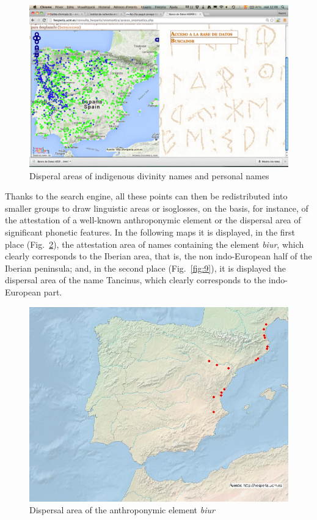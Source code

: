 \documentclass[amsthm,ebook]{saparticle}
\begin{document}
\begin{figure}[!hbp]
\centering
 \includegraphics[width=\columnwidth]{EpigraphyandonomasticsinHesperiadatabanktemplate-img007.png}
\caption{Disperal areas of indigenous divinity names and personal names}
\label{fig:7}
\end{figure}
 

Thanks to the search engine, all these points can then be redistributed into smaller groups to draw linguistic areas or
isoglosses, on the basis, for instance, of the attestation of a well-known anthroponymic element or the dispersal area
of significant phonetic features. In the following maps it is displayed, in the first place (Fig.~\ref{fig:8}), the attestation area of
names containing the element \emph{biur}, which clearly corresponds to the Iberian area, that is, the non indo-European half
of the Iberian peninsula; and, in the second place (Fig.~\ref{fig:9}), it is displayed the dispersal area of the name Tancinus, which
clearly corresponds to the indo-European part.

\begin{figure}[!hbp]
\centering
 \includegraphics[width=\columnwidth]{EpigraphyandonomasticsinHesperiadatabanktemplate-img008.jpg}
\caption{Dispersal area of the anthroponymic element \emph{biur}}
\label{fig:8}
\end{figure}
\end{document}
